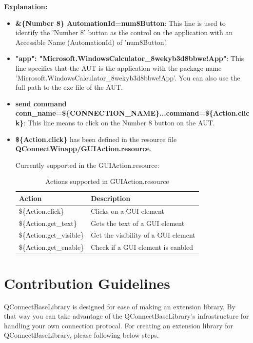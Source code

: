 \textbf{Explanation:}
\begin{itemize}
\item \colorbox{gray!16}{\textbf{\&\{Number 8\} AutomationId=num8Button}}: This line is used to identify the 'Number 8' button as the control on the application with an Accessible Name (AutomationId) of 'num8Button'.
\item \colorbox{gray!16}{\textbf{"app": "Microsoft.WindowsCalculator\_8wekyb3d8bbwe!App"}}: This line specifies that the AUT is the application with the package name 'Microsoft.WindowsCalculator\_8wekyb3d8bbwe!App'. You can also use the full path to the exe file of the AUT.
\item \colorbox{gray!16}{\textbf{send command conn\_name=\$\{CONNECTION\_NAME\}...command=\$\{Action.click\}}}: This line means to click on the Number 8 button on the AUT.
\item \colorbox{gray!16}{\textbf{\$\{Action.click\}}} has been defined in the resource file \colorbox{gray!16}{\textbf{QConnectWinapp/GUIAction.resource}}.

Currently supported in the GUIAction.resource:
\begin{table}[h]
    \centering
    \begin{tabular}{|l|l|}
        \hline
        \textbf{Action} & \textbf{Description} \\ \hline
        \$\{Action.click\} & Clicks on a GUI element \\ \hline
        \$\{Action.get\_text\} & Gets the text of a GUI element \\ \hline
        \$\{Action.get\_visible\} & Get the visibility of a GUI element \\ \hline
        \$\{Action.get\_enable\} & Check if a GUI element is eanbled \\ \hline
    \end{tabular}
    \caption{Actions supported in GUIAction.resource}
    \label{tab:actions}
\end{table}


\end{itemize}


\hypertarget{contribution-guidelines}{%
\section{Contribution Guidelines}\label{contribution-guidelines}}

QConnectBaseLibrary is designed for ease of making an extension library.
By that way you can take advantage of the QConnectBaseLibrary's
infrastructure for handling your own connection protocal. For creating
an extension library for QConnectBaseLibrary, please following below
steps.


